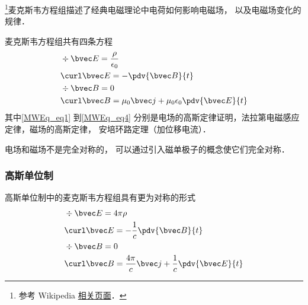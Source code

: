 
\begin{issues}
\issueDraft
\end{issues}

\footnote{参考 Wikipedia \href{https://en.wikipedia.org/wiki/Maxwell's_equations}{相关页面}．}麦克斯韦方程组描述了经典电磁理论中电荷如何影响电磁场， 以及电磁场变化的规律．

麦克斯韦方程组共有四条方程
\begin{align}
\label{MWEq_eq1}
&\div \bvec E = \frac{\rho}{\epsilon_0}\\
\label{MWEq_eq2}
&\curl \bvec E = -\pdv{\bvec B}{t}\\
\label{MWEq_eq3}
&\div \bvec B = 0 \\
\label{MWEq_eq4}
&\curl \bvec B = \mu_0 \bvec j + \mu_0\epsilon_0 \pdv{\bvec E}{t}
\end{align}
其中\autoref{MWEq_eq1} 到\autoref{MWEq_eq4} 分别是电场的高斯定律证明，法拉第电磁感应定律，磁场的高斯定律， 安培环路定理（加位移电流）．%

电场和磁场不是完全对称的， 可以通过引入磁单极子的概念使它们完全对称．

\subsubsection{高斯单位制}
高斯单位制中的麦克斯韦方程组具有更为对称的形式
\begin{align}
&\div \bvec E = 4\pi\rho\\
&\curl \bvec E = -\frac{1}{c}\pdv{\bvec B}{t}\\
&\div \bvec B = 0 \\
&\curl \bvec B = \frac{4\pi}{c} \bvec j + \frac{1}{c}\pdv{\bvec E}{t}
\end{align}
